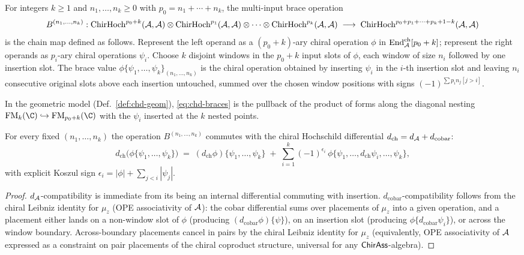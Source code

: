 \begin{definition}%
\label{def:chd-braces}%
%
For integers $k \ge 1$ and $n_1, \ldots, n_k \ge 0$ with
$p_0 = n_1 + \cdots + n_k$, the multi-input brace operation
\begin{equation}\label{eq:chd-braces}
 B^{(n_1, \ldots, n_k)}:
 \mathrm{ChirHoch}^{p_0+k}(\mathcal{A},\mathcal{A}) \otimes
 \mathrm{ChirHoch}^{p_1}(\mathcal{A},\mathcal{A}) \otimes \cdots \otimes
 \mathrm{ChirHoch}^{p_k}(\mathcal{A},\mathcal{A})
 \;\longrightarrow\;
 \mathrm{ChirHoch}^{p_0+p_1+\cdots+p_k+1-k}(\mathcal{A},\mathcal{A})
\end{equation}
is the chain map defined as follows. Represent the left operand as a
$(p_0+k)$-ary chiral operation $\phi$ in
$\mathrm{End}^{\mathrm{ch}}_{\mathcal{A}}[p_0+k]$; represent the right operands as
$p_i$-ary chiral operations $\psi_i$. Choose $k$ disjoint windows in
the $p_0+k$ input slots of $\phi$, each window of size $n_i$ followed
by one insertion slot. The brace value
$\phi\{\psi_1, \ldots, \psi_k\}_{(n_1, \ldots, n_k)}$ is the chiral
operation obtained by inserting $\psi_i$ in the $i$-th insertion slot
and leaving $n_i$ consecutive original slots above each insertion
untouched, summed over the chosen window positions with signs
$(-1)^{\sum p_i n_j[j>i]}$.

In the geometric model (Def.~\ref{def:chd-geom}), \eqref{eq:chd-braces}
is the pullback of the product of forms along the diagonal nesting
$\FM_k(\C)\hookrightarrow \FM_{p_0+k}(\C)$ with the $\psi_i$ inserted
at the $k$ nested points.
\end{definition}

\begin{proposition}%
\label{prop:chd-brace-chain-map}%
%
For every fixed $(n_1, \ldots, n_k)$ the operation
$B^{(n_1, \ldots, n_k)}$ commutes with the chiral Hochschild
differential $d_{\mathrm{ch}} = d_{\mathcal{A}} + d_{\mathrm{cobar}}$:
\[
 d_{\mathrm{ch}}\bigl(\phi\{\psi_1, \ldots, \psi_k\}\bigr) \;=\;
 (d_{\mathrm{ch}}\phi)\{\psi_1, \ldots, \psi_k\} \;+\;
 \sum_{i=1}^k (-1)^{\epsilon_i}\, \phi\{\psi_1, \ldots, d_{\mathrm{ch}}\psi_i, \ldots, \psi_k\},
\]
with explicit Koszul sign $\epsilon_i = |\phi| + \sum_{j<i} |\psi_j|$.
\end{proposition}

\begin{proof}
$d_{\mathcal{A}}$-compatibility is immediate from its being an internal
differential commuting with insertion. $d_{\mathrm{cobar}}$-compatibility
follows from the chiral Leibniz identity for $\mu_z$ (OPE
associativity of $\mathcal{A}$): the cobar differential sums over placements
of $\mu_z$ into a given operation, and a placement either lands on a
non-window slot of $\phi$ (producing
$(d_{\mathrm{cobar}}\phi)\{\psi\}$), on an insertion slot
(producing $\phi\{d_{\mathrm{cobar}}\psi_i\}$), or across the window
boundary. Across-boundary placements cancel in pairs by the chiral
Leibniz identity for $\mu_z$ (equivalently, OPE associativity of $\mathcal{A}$
expressed as a constraint on pair placements of the chiral
coproduct structure, universal for any $\mathsf{ChirAss}$-algebra).
\end{proof}

